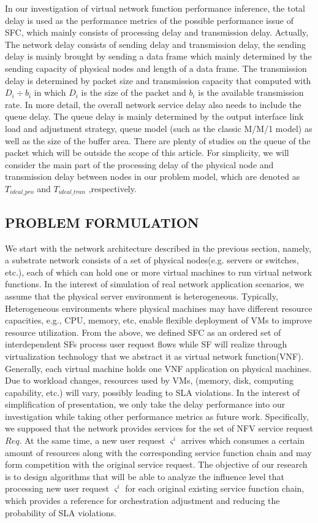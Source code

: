 \documentclass{ieeeaccess}
\begin{document}
In our investigation of virtual network function performance inference, the total delay is used as the performance metrics of the possible performance issue of SFC, which mainly consists of processing delay and transmission delay.  Actually, The network delay consists of sending delay and transmission delay, the sending delay is mainly brought by sending a data frame which mainly determined by the sending capacity of physical nodes and length of a data frame. The transmission delay is determined by packet size and transmission capacity that computed with $D_{i} \div b_{i}$   in which $D_{i}$ is the size of the packet and $b_{i}$ is the available transmission rate. In more detail, the overall network service delay also needs to include the queue delay. The queue delay is mainly determined by the output interface link load and adjustment strategy, queue model (such as the classic M/M/1 model\cite{b23}) as well as the size of the buffer area. There are plenty of studies on the queue of the packet which will be outside the scope of this article. For simplicity, we will consider the main part of the processing delay of the physical node and transmission delay between nodes in our problem model, which are denoted as $T_{ideal\_pro}$ and $T_{ideal\_tran}$ ,respectively.

\subsection{PROBLEM FORMULATION}
We start with the network architecture described in the previous section, namely, a substrate network consists of a set of physical nodes(e.g. servers or switches, etc.), each of which can hold one or more virtual machines to run virtual network functions. In the interest of simulation of real network application scenarios, we assume that the physical server environment is heterogeneous. Typically, Heterogeneous environments where physical machines may have different resource capacities, e.g., CPU, memory, etc, enable flexible deployment of VMs to improve resource utilization. From the above, we defined SFC as an ordered set of interdependent SFs process user request flows while SF will realize through virtualization technology that we abstract it as virtual network function(VNF). Generally, each virtual machine holds one VNF application on physical machines. Due to workload changes, resources used by VMs, (memory, disk, computing capability, etc.) will vary, possibly leading to SLA violations. In the interest of simplification of presentation, we only take the delay performance into our investigation while taking other performance metrics as future work. Specifically, we supposed that the network provides services for the set of NFV service request  $Req$. At the same time, a new user request  ${\varsigma}^{i}$  arrives which consumes a certain amount of resources along with the corresponding service function chain and may form competition with the original service request. The objective of our research is to design algorithms that will be able to analyze the influence level that processing new user request ${\varsigma}^{i}$  for each original existing  service function chain, which provides a reference for orchestration adjustment and reducing the probability of SLA violations.
\end{document}
